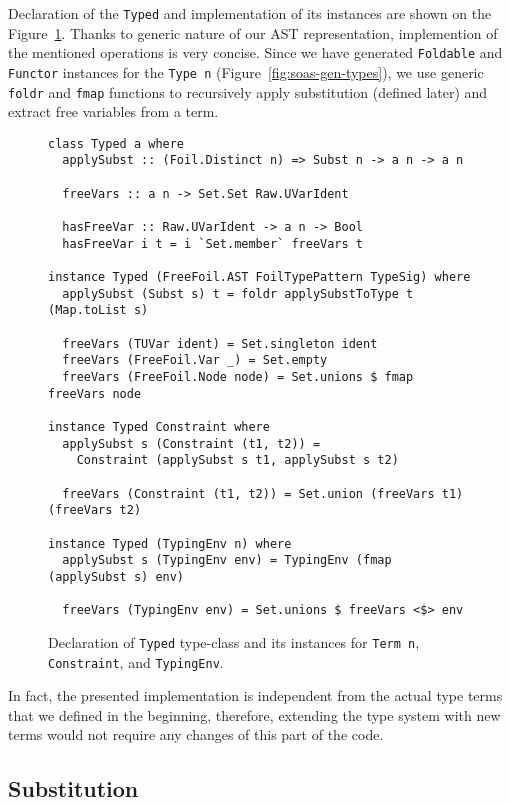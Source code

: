 Declaration of the \texttt{Typed} and implementation of its instances are shown on the Figure~\ref{fig:typed-class}. Thanks to generic nature of our AST representation, implemention of the mentioned operations is very concise. Since we have generated \texttt{Foldable} and \texttt{Functor} instances for the \texttt{Type n} (Figure~\ref{fig:soas-gen-types}), we use generic \texttt{foldr} and \texttt{fmap} functions to recursively apply substitution (defined later) and extract free variables from a term.

\begin{figure}[H]
  \begin{verbatim}
class Typed a where
  applySubst :: (Foil.Distinct n) => Subst n -> a n -> a n

  freeVars :: a n -> Set.Set Raw.UVarIdent

  hasFreeVar :: Raw.UVarIdent -> a n -> Bool
  hasFreeVar i t = i `Set.member` freeVars t

instance Typed (FreeFoil.AST FoilTypePattern TypeSig) where
  applySubst (Subst s) t = foldr applySubstToType t (Map.toList s)

  freeVars (TUVar ident) = Set.singleton ident
  freeVars (FreeFoil.Var _) = Set.empty
  freeVars (FreeFoil.Node node) = Set.unions $ fmap freeVars node

instance Typed Constraint where
  applySubst s (Constraint (t1, t2)) =
    Constraint (applySubst s t1, applySubst s t2)

  freeVars (Constraint (t1, t2)) = Set.union (freeVars t1) (freeVars t2)

instance Typed (TypingEnv n) where
  applySubst s (TypingEnv env) = TypingEnv (fmap (applySubst s) env)

  freeVars (TypingEnv env) = Set.unions $ freeVars <$> env  
  \end{verbatim}
  \caption[\texttt{Typed} type-class]{Declaration of \texttt{Typed} type-class and its instances for \texttt{Term n}, \texttt{Constraint}, and \texttt{TypingEnv}.}
  \label{fig:typed-class}
\end{figure}

In fact, the presented implementation is independent from the actual type terms that we defined in the beginning, therefore, extending the type system with new terms would not require any changes of this part of the code.

\subsection{Substitution}

